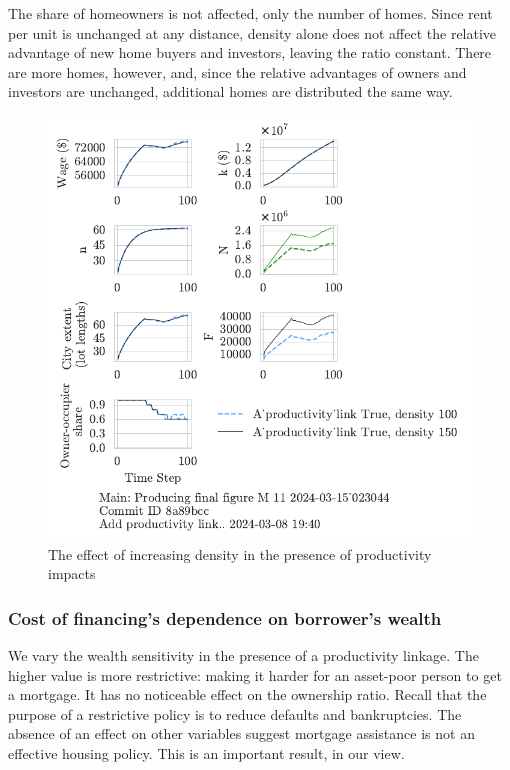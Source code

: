 {The share of homeowners is not affected, only the number of homes. Since rent per unit is unchanged at any distance, density alone does not affect the relative advantage of new home buyers and investors, leaving the ratio constant. There are more homes, however, and, since the relative advantages of owners and investors are unchanged, additional homes are distributed the same way.  



\begin{figure}[h!bt]
    \centering
    \includegraphics[scale=.8, trim={0 1.4cm 0 0},clip]{fig/With-productivity_link-density-023044.pdf}
    \caption{The effect of increasing density in the presence of productivity impacts}
    \label{fig:Productivity_link_and_density_ownership_trajectory}
\end{figure}


\newpage

\subsubsection{Cost of financing's dependence on borrower's wealth}
We vary the wealth sensitivity in the presence of a productivity linkage. The higher value is more restrictive:  making it harder for an asset-poor person to get a mortgage. It has no noticeable effect on the ownership ratio. Recall that the purpose of a restrictive policy is to reduce defaults and bankruptcies. The absence of an effect on other variables suggest mortgage assistance is not an effective housing policy.  This is an important result, in our view.

}
